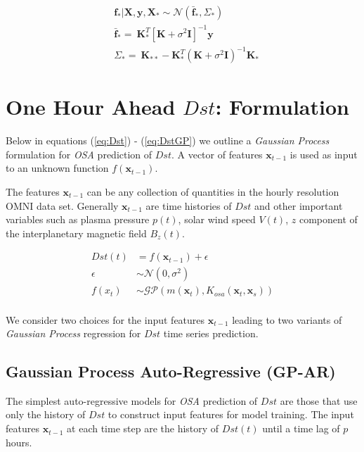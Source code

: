 \documentclass{article}
\begin{document}
\begin{align}
    & \mathbf{f_*}|\mathbf{X},\mathbf{y},\mathbf{X_*} \sim \mathcal{N}(\mathbf{\bar{f}_*}, \Sigma_*)  \label{eq:posterior} \\
    & \mathbf{\bar{f}_*} =  \ \mathbf{K}^T_{*} [\mathbf{K} + \sigma^{2} \mathbf{I}]^{-1} \mathbf{y} \label{eq:posteriormean} \\
    & \Sigma_* = \ \mathbf{K}_{**} - \mathbf{K}^T_{*} \left(\mathbf{K} + \sigma^{2} \mathbf{I}\right)^{-1} \mathbf{K}_{*} \label{eq:posteriorcov}
\end{align}

\section{One Hour Ahead $Dst$: Formulation} \label{sec:osa}

Below in equations (\ref{eq:Dst}) - (\ref{eq:DstGP}) we outline a \emph{Gaussian Process} formulation for \emph{OSA} prediction of $Dst$. A vector of features $\mathbf{x}_{t-1}$ is used as input to an unknown function $f(\mathbf{x}_{t-1})$.

The features $\mathbf{x}_{t-1}$ can be any collection of quantities in the hourly resolution OMNI data set. Generally $\mathbf{x}_{t-1}$ are time histories of $Dst$ and other important variables such as plasma pressure $p(t)$, solar wind speed $V(t)$, $z$ component of the interplanetary magnetic field $B_z(t)$.


\begin{align}
    Dst(t) & =  f(\mathbf{x}_{t-1}) + \epsilon \label{eq:Dst} \\
    \epsilon & \sim  \mathcal{N}(0, \sigma^2) \label{eq:GPNoise} \\
    f(x_t) & \sim  \mathcal{GP}(m(\mathbf{x}_t), K_{osa}(\mathbf{x}_t, \mathbf{x}_s)) \label{eq:DstGP} \\
\end{align}

We consider two choices for the input features $\mathbf{x}_{t-1}$ leading to two variants of \emph{Gaussian Process} regression for $Dst$ time series prediction.

\subsection{Gaussian Process Auto-Regressive (GP-AR)} \label{sec:gpar}

The simplest auto-regressive models for \emph{OSA} prediction of $Dst$ are those that use only the history of $Dst$ to construct input features for model training. The input features $\mathbf{x}_{t-1}$ at each time step are the history of $Dst(t)$ until a time lag of $p$ hours.
\end{document}
